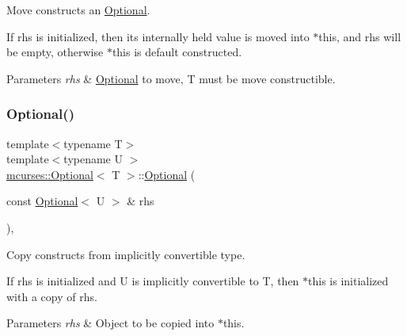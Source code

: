 Move constructs an \hyperlink{classmcurses_1_1Optional}{Optional}. 

If {\ttfamily rhs} is initialized, then its internally held value is moved into $\ast$this, and {\ttfamily rhs} will be empty, otherwise $\ast$this is default constructed. 
\begin{DoxyParams}{Parameters}
{\em rhs} & \hyperlink{classmcurses_1_1Optional}{Optional} to move, T must be move constructible. \\
\hline
\end{DoxyParams}
\hypertarget{classmcurses_1_1Optional_aa89d00c7dcd0b47c2b8fb5ac077795c4}{}\label{classmcurses_1_1Optional_aa89d00c7dcd0b47c2b8fb5ac077795c4} 
\subsubsection{\texorpdfstring{Optional()}{Optional()}\hspace{0.1cm}{\footnotesize\ttfamily [9/10]}}
{\footnotesize\ttfamily template$<$typename T$>$ \\
template$<$typename U $>$ \\
\hyperlink{classmcurses_1_1Optional}{mcurses\+::\+Optional}$<$ T $>$\+::\hyperlink{classmcurses_1_1Optional}{Optional} (\begin{DoxyParamCaption}\item[{const \hyperlink{classmcurses_1_1Optional}{Optional}$<$ U $>$ \&}]{rhs }\end{DoxyParamCaption})\hspace{0.3cm}{\ttfamily [inline]}, {\ttfamily [explicit]}}



Copy constructs from implicitly convertible type. 

If {\ttfamily rhs} is initialized and U is implicitly convertible to T, then $\ast$this is initialized with a copy of {\ttfamily rhs}. 
\begin{DoxyParams}{Parameters}
{\em rhs} & Object to be copied into $\ast$this. \\
\hline
\end{DoxyParams}
\hypertarget{classmcurses_1_1Optional_a8818f33dbbe44f276c8ba36b83d4b4f6}{}\label{classmcurses_1_1Optional_a8818f33dbbe44f276c8ba36b83d4b4f6} 
